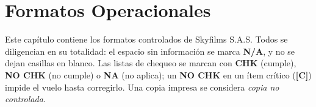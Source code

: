\chapter{Formatos Operacionales}
\label{chap:formatos}
\label{inicio_cap6}

Este capítulo contiene los formatos controlados de Skyfilms S.A.S. Todos se diligencian en su totalidad: el espacio sin información se marca \textbf{N/A}, y no se dejan casillas en blanco. Las listas de chequeo se marcan con \textbf{CHK} (cumple), \textbf{NO CHK} (no cumple) o \textbf{NA} (no aplica); un \textbf{NO CHK} en un ítem crítico (\textbf{[C]}) impide el vuelo hasta corregirlo. Una copia impresa se considera \textit{copia no controlada}.

\newcommand{\cab}[5]{%
  \clearpage
  \section{#1 --- #2}\label{fmt:#1}
  \renewcommand{\arraystretch}{1.4}
  \par\noindent\begin{tabularx}{\textwidth}{|l|X|l|X|}
    \hline
    \rowcolor[gray]{0.9}\textbf{Código} & #1 & \textbf{Versión} & 1.0 \\ \hline
    \textbf{Fecha de emisión} & 23/06/2026 & \textbf{Explotador} & Skyfilms S.A.S. \\ \hline
    \textbf{Diligencia} & #3 & \textbf{Recibe / archiva} & #4 \\ \hline
    \multicolumn{4}{|p{\dimexpr\textwidth-2\tabcolsep-2\arrayrulewidth}|}{\textbf{Cuándo se usa:} #5} \\ \hline
  \end{tabularx}
  \vspace{0.4cm}
}
\newcommand{\campos}[1]{%
  \par\noindent\begin{tabularx}{\textwidth}{|X|X|}\hline #1 \end{tabularx}\vspace{0.3cm}
}
\newcommand{\caja}[2]{%
  \par\noindent\begin{tabularx}{\textwidth}{|X|}\hline \textbf{#1} \\ \hline \rule{0pt}{#2} \\ \hline \end{tabularx}\vspace{0.3cm}
}
\newcommand{\firmas}{%
  \par\noindent\begin{tabularx}{\textwidth}{|X|X|}\hline
  \textbf{Nombre:} & \textbf{Firma:} \\[0.6cm] \hline \end{tabularx}
}
\newcommand{\chk}{$\square$ CHK\ \ $\square$ NO CHK\ \ $\square$ NA}
\newcommand{\lcitem}[2]{#1 & #2 & \chk \\ \hline}
\newcommand{\lchead}[1]{\multicolumn{3}{|l|}{\cellcolor[gray]{0.85}\textbf{#1}} \\ \hline}
\newcommand{\fx}[1]{#1#1#1#1#1}

